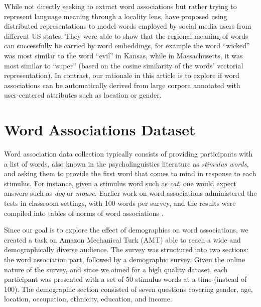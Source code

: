 \documentclass[11pt,letterpaper]{article}
\begin{document}
While not directly seeking to extract word associations but rather trying to represent language meaning through a locality lens, \cite{Bamman2014} have proposed using distributed representations to model words employed by social media users from different US states. They were able to show that the regional meaning of words can successfully be carried by word embeddings, for example the word ``wicked'' was most similar to the word ``evil'' in Kansas, while in Massachusetts, it was most similar to ``super'' (based on the cosine similarity of the words' vectorial representation). In contrast, our rationale in this article is to explore if word associations can be automatically derived from large corpora annotated with user-centered attributes such as location or gender. 




\section{Word Associations Dataset}
Word association data collection typically consists of providing  participants with a list of words, also known in the psycholinguistics literature as {\it stimulus words}, and asking them to provide the first word that comes to mind in response to each stimulus. For instance, given a stimulus word such as {\it cat}, one would expect answers such as {\it dog} or {\it mouse}. Earlier work on word associations administered the tests in classroom settings, with 100 words per survey, and the results were compiled into tables of norms of word associations \cite{Kent10,Nelson2004}. 

Since our goal is to explore the effect of demographics on word associations, we created a task on Amazon Mechanical Turk (AMT) able to reach a wide and demographically diverse audience. The survey was structured into two sections: the word association part, followed by a demographic survey.
Given the online nature of the survey, and since we aimed for a high quality dataset, each participant was presented with a set of 50 stimulus words at a time (instead of 100). The demographic section consisted of seven questions covering gender, age, location, occupation, ethnicity, education, and income.
\end{document}
